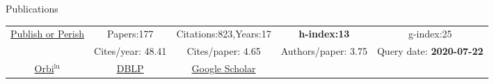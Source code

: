 \begin{rubrique}{Publications}

  {\footnotesize

    \vspace*{-2em}
    \begin{center}
      \begin{tabular}{|c||cccc|}
        \hline
        \multirow{2}{4em}{\href{http://www.harzing.com/pop.htm}{Publish or Perish}}
        & Papers:177        & Citations:823,Years:17   & \textbf{h-index:13} & g-index:25 \\
        & Cites/year: 48.41 & Cites/paper: 4.65        & Authors/paper: 3.75 & Query date: \textbf{2020-07-22}\\
        \hline
        \href{https://orbilu.uni.lu/simple-search?query=varrette}{Orbi$^\text{lu}$} &
        \multicolumn{1}{c|}{\href{http://www.informatik.uni-trier.de/~ley/pers/hd/v/Varrette:S=eacute=bastien.html}{DBLP}} &                                                                                                \multicolumn{1}{c|}{\href{https://scholar.google.fr/citations?hl=fr\&user=6PTStIcAAAAJ\&view_op=list_works\&sortby=pubdate}{Google Scholar}}\\
        \cline{1-3}
      \end{tabular}
    \end{center}
  }




\end{rubrique}





%
